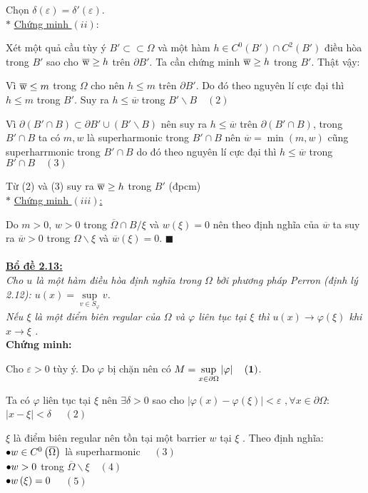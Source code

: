 Chọn $\delta (\varepsilon ) = \delta '(\varepsilon ).$
\\
$*$ \underline{Chứng minh $(ii):$}

Xét một quả cầu tùy ý $B' \subset  \subset \Omega $ và một hàm $h \in C^0 (B') \cap C^2 (B')$ điều hòa trong $B'$ sao cho $\overline {\rm{w}}  \ge h$ trên $\partial B'$. Ta cần chứng minh $\overline {\rm{w}}  \ge h$ trong $ B'$. Thật vậy:

Vì $\overline {\rm{w}}  \le m$ trong $\Omega$ cho nên $h\le m$ trên $\partial B'$. Do đó theo nguyên lí cực đại thì $h\le m$ trong $B'$. Suy ra $h\le \overline w$ trong $B'\backslash B \quad (2)$

Vì $\partial (B' \cap B) \subset \partial B' \cup (B'\backslash B)$ nên suy ra $h\le \overline w$ trên $\partial(B'\cap B)$, trong $B' \cap B$ ta có $m,w$ là superharmonic  trong $B' \cap B$ nên $\overline w=\min(m,w)$ cũng superharrmonic  trong $B' \cap B$ do đó theo nguyên lí cực đại thì $h\le \overline w$ trong $B'\cap B \quad (3)$

Từ (2) và (3) suy ra $\overline {\rm{w}}  \ge h$ trong $ B'$ (đpcm)
\\
$*$ \underline {Chứng minh $(iii)$:}

Do $m>0$, $w>0$ trong $\overline \Omega   \cap B/\xi $ và $w(\xi)=0$ nên theo định nghĩa của $\overline w$ ta suy ra  $\overline w>0$ trong $\Omega \backslash \xi $ và $\overline w(\xi)=0$. $\blacksquare$
\\
\\
{\bf \underline{Bổ đề 2.13:}}
\\
{\it
Cho $u$ là một hàm điều hòa định nghĩa trong $\Omega $ bởi phương pháp Perron (định lý 2.12):  $u(x) = \mathop {\sup }\limits_{v \in S_\varphi  } v$.\\
 Nếu $\xi $ là một điểm biên regular của $\Omega $ và $\varphi $ liên tục tại $\xi$ thì $u\left( x \right) \to \varphi \left( \xi  \right)$ khi $x \to \xi $ .}
 \\
{\bf Chứng minh:}

Cho $\varepsilon  > 0$ tùy ý. Do $\varphi$ bị chặn nên có $M = \mathop {\sup }\limits_{x \in \partial \Omega } \left| \varphi  \right|\quad {\bf (1)}$.

Ta có $\varphi $ liên tục tại $\xi$ nên  $\exists \delta  > 0$ sao cho $\left| {\varphi \left( x \right) - \varphi \left( \xi  \right)} \right| < \varepsilon $ $,\forall x \in \partial \Omega: $ $\left| {x - \xi } \right| < \delta $ $\quad (2)$

$\xi $ là điểm biên regular nên tồn tại một barrier $w$ tại $\xi $ . Theo định nghĩa:
\\
 $ \bullet {\rm{ }}w \in {C^0}\left( {\overline \Omega  } \right)$ là superharmonic $\quad (3)$
\\
$ \bullet {\rm{ }}w > 0$ trong $\overline \Omega  \backslash \xi \quad (4)$
\\
$ \bullet {\rm{ }}w\left( \xi  \right) = 0$ 	$\quad (5)$

